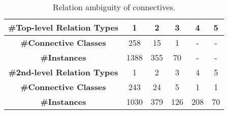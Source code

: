 \begin{table}[ht]
\centering
\begin{tabular}{|c|c|c|c|c|c|}
\hline
\bf \#Top-level Relation Types & 1    & 2   & 3   & 4   & 5  \\ \hline
\bf \#Connective Classes       & 258  & 15  & 1   & -   & -  \\ \hline
\bf \#Instances                & 1388 & 355 & 70  & -   & -  \\ \hline

\hhline{|=|=|=|=|=|=|}

\bf \#2nd-level Relation Types & 1    & 2   & 3   & 4   & 5  \\ \hline
\bf \#Connective Classes       & 243  & 24  & 5   & 1   & 1  \\ \hline
\bf \#Instances                & 1030 & 379 & 126 & 208 & 70 \\ \hline

\end{tabular}
\caption{\label{t:connective-type} Relation ambiguity of connectives. }
\end{table}
